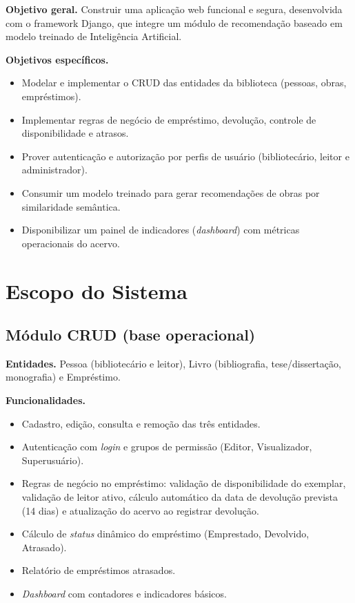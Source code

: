 \noindent\textbf{Objetivo geral.} Construir uma aplicação web funcional e segura, desenvolvida com o framework Django, que integre um módulo de recomendação baseado em modelo treinado de Inteligência Artificial.

\noindent\textbf{Objetivos específicos.}

\begin{itemize}
    \item Modelar e implementar o CRUD das entidades da biblioteca (pessoas, obras, empréstimos).
    \item Implementar regras de negócio de empréstimo, devolução, controle de disponibilidade e atrasos.
    \item Prover autenticação e autorização por perfis de usuário (bibliotecário, leitor e administrador).
    \item Consumir um modelo treinado para gerar recomendações de obras por similaridade semântica.
    \item Disponibilizar um painel de indicadores (\textit{dashboard}) com métricas operacionais do acervo.
\end{itemize}

\section{Escopo do Sistema}

\subsection{Módulo CRUD (base operacional)}

\noindent\textbf{Entidades.} Pessoa (bibliotecário e leitor), Livro (bibliografia, tese/dissertação, monografia) e Empréstimo.

\noindent\textbf{Funcionalidades.}

\begin{itemize}
    \item Cadastro, edição, consulta e remoção das três entidades.
    \item Autenticação com \textit{login} e grupos de permissão (Editor, Visualizador, Superusuário).
    \item Regras de negócio no empréstimo: validação de disponibilidade do exemplar, validação de leitor ativo, cálculo automático da data de devolução prevista (14 dias) e atualização do acervo ao registrar devolução.
    \item Cálculo de \textit{status} dinâmico do empréstimo (Emprestado, Devolvido, Atrasado).
    \item Relatório de empréstimos atrasados.
    \item \textit{Dashboard} com contadores e indicadores básicos.
\end{itemize}

